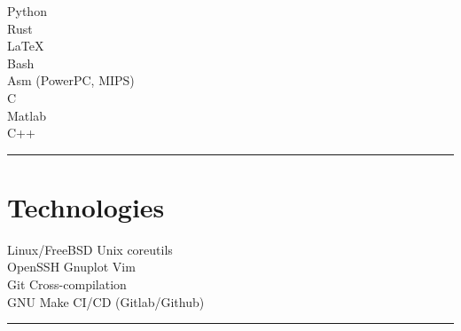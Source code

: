 \documentclass[letterpaper]{deedy-resume}
\begin{document}
\begin{minipage}[t]{0.3\textwidth}
\vspace{1em}

\textbullet{} Python \\
\textbullet{} Rust\\
\textbullet{} \LaTeX \\
\textbullet{} Bash \\
\textbullet{} Asm (PowerPC, MIPS) \\
\textbullet{} C \\
\textbullet{} Matlab \\
\textbullet{} C++ \\

\sectionspace %
\vspace{-1ex}
\rule{5cm}{0.5pt}
\vspace{2em}

\section{Technologies}

\vspace{1em}

Linux/FreeBSD \textbullet{} Unix coreutils\\
OpenSSH \textbullet{} Gnuplot \textbullet{} Vim\\
Git \textbullet{} Cross-compilation\\
GNU Make \textbullet{} CI/CD (Gitlab/Github)
\sectionspace
\vspace{-1.5ex}
\rule{5cm}{0.5pt}
\vspace{2em}






\end{minipage}
\end{document}
